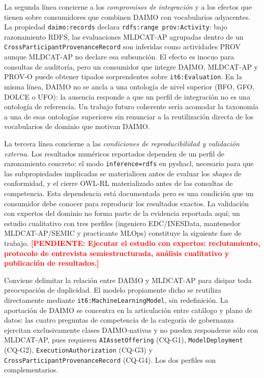 \documentclass[11pt,a4paper]{article}
\newcommand{\code}[1]{\texttt{#1}}
\newcommand{\TODO}[1]{\textcolor{red}{\textbf{[PENDIENTE: #1]}}}
\begin{document}
La segunda línea concierne a los \emph{compromisos de integración} y a los efectos que tienen sobre consumidores que combinen DAIMO con vocabularios adyacentes. La propiedad \code{daimo:records} declara \code{rdfs:range~prov:Activity}: bajo razonamiento RDFS, las evaluaciones MLDCAT-AP agrupadas dentro de un \code{CrossParticipantProvenanceRecord} son inferidas como actividades PROV aunque MLDCAT-AP no declare esa subsunción. El efecto es inocuo para consultas de auditoría, pero un consumidor que integre DAIMO, MLDCAT-AP y PROV-O puede obtener tipados sorprendentes sobre \code{it6:Evaluation}. En la misma línea, DAIMO no se ancla a una ontología de nivel superior (BFO, GFO, DOLCE o UFO): la ausencia responde a que un perfil de integración no es una ontología de referencia. Un trabajo futuro coherente sería acomodar la taxonomía a una de esas ontologías superiores sin renunciar a la reutilización directa de los vocabularios de dominio que motivan DAIMO.

La tercera línea concierne a las \emph{condiciones de reproducibilidad y validación externa}. Los resultados numéricos reportados dependen de un perfil de razonamiento concreto: el modo \code{inference=rdfs} en pyshacl, necesario para que las subpropiedades implicadas se materialicen antes de evaluar los \emph{shapes} de conformidad, y el cierre OWL-RL materializado antes de las consultas de competencia. Esta dependencia está documentada pero es una condición que un consumidor debe conocer para reproducir los resultados exactos. La validación con expertos del dominio no forma parte de la evidencia reportada aquí; un estudio cualitativo con tres perfiles (ingeniero EDC/INESData, mantenedor MLDCAT-AP/SEMIC y practicante MLOps) constituye la siguiente fase de trabajo. \TODO{Ejecutar el estudio con expertos: reclutamiento, protocolo de entrevista semiestructurada, análisis cualitativo y publicación de resultados.}

Conviene delimitar la relación entre DAIMO y MLDCAT-AP para disipar toda preocupación de duplicidad. El modelo propiamente dicho se reutiliza directamente mediante \code{it6:MachineLearningModel}, sin redefinición. La aportación de DAIMO se concentra en la articulación entre catálogo y plano de datos: las cuatro preguntas de competencia de la categoría de gobernanza ejercitan exclusivamente clases DAIMO-nativas y no pueden responderse sólo con MLDCAT-AP, pues requieren \code{AIAssetOffering} (CQ-G1), \code{ModelDeployment} (CQ-G2), \code{ExecutionAuthorization} (CQ-G3) y \code{CrossParticipantProvenanceRecord} (CQ-G4). Los dos perfiles son complementarios.
\end{document}
